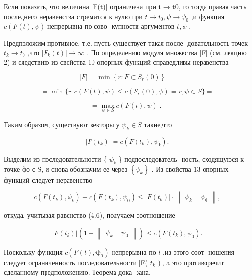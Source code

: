 \documentclass[8pt]{extarticle}
\begin{document}
Если показать, что величина |F(t)| ограничена при t → t0, то тогда правая часть последнего неравенства стремится к нулю при \(t \rightarrow  {t}_{0},\psi  \rightarrow  {\psi }_{0}\) ,и функция \(c\left( {F\left( t\right) ,\psi }\right)\) непрерывна по сово- купности аргументов \(t,\psi\) .

Предположим противное, т.е. пусть существует такая после- довательность точек \({t}_{k} \rightarrow  {t}_{0}\) ,что \(\left| {{F}_{k}\left( t\right) }\right|  \rightarrow  \infty\) . По определению модуля множества |F| (см. лекцию 2) и следствию из свойства 10 опорных функций справедливы неравенства

\[
\left| F\right|  = \min \left\{  {r : F \subset  {S}_{r}\left( 0\right) }\right\}   =
\]

\[
= \min \{ r : c\left( {F\left( t\right) ,\psi }\right)  \leq  c\left( {{S}_{r}\left( 0\right) ,\psi }\right)  = r,\psi  \in  S\}  =
\]

\[
= \mathop{\max }\limits_{{\psi  \in  S}}c\left( {F\left( t\right) ,\psi }\right) \text{ . } \tag{4.5}
\]

Таким образом, существуют векторы у \({\psi }_{k} \in  S\) такие,что

\[
\left| {F\left( {t}_{k}\right) }\right|  = c\left( {F\left( {t}_{k}\right) ,{\psi }_{k}}\right) . \tag{4.6}
\]

Выделим из последовательности \{ \({\psi }_{k}\) \} подпоследователь- ность, сходящуюся к точке фо с S, и снова обозначим ее через \(\left\{  {\psi }_{k}\right\}\) . Из свойства 13 опорных функций следует неравенство

\[
c\left( {F\left( {t}_{k}\right) ,{\psi }_{k}}\right)  - c\left( {F\left( {t}_{k}\right) ,{\psi }_{0}}\right)  \leq  \left| {F\left( {t}_{k}\right) }\right|  \cdot  \left\lVert \begin{array}{c} {{\psi }_{k} - {\psi }_{0}} \end{array} \right\rVert,
\]

откуда, учитывая равенство (4.6), получаем соотношение

\[
\left| {F\left( {t}_{k}\right) }\right| \left( {1 - \left\lVert \begin{array}{c} {{\psi }_{k} - {\psi }_{0}} \end{array} \right\rVert}\right)  \leq  c\left( {F\left( {t}_{k}\right) ,{\psi }_{0}}\right) .
\]

Поскольку функция \(c\left( {F\left( t\right) ,{\mathbf{\psi }}_{0}}\right)\) непрерывна по \(t\) ,из этого соот- ношения следует ограниченность последовательности |F( \({t}_{k}\) )|, a это противоречит сделанному предположению. Теорема дока- зана.
\end{document}
